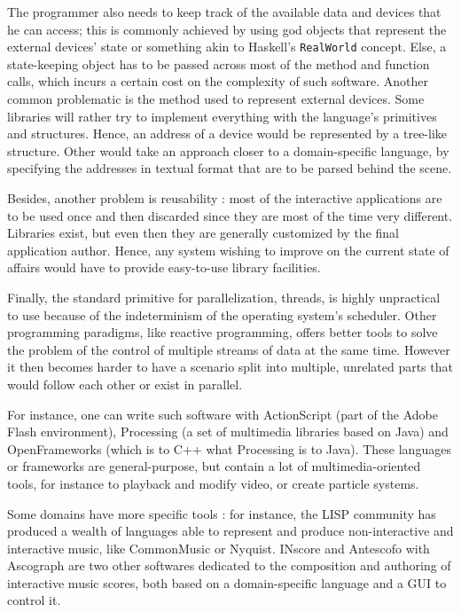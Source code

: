 \documentclass{sigchi}
\begin{document}
The programmer also needs to keep track of the available data and devices that he can access; this is commonly achieved by using god objects that represent the external devices' state or something akin to Haskell's \texttt{RealWorld} concept\cite{launchbury1995state}. Else, a state-keeping object has to be passed across most of the method and function calls, which incurs a certain cost on the complexity of such software. Another common problematic is the method used to represent external devices. Some libraries will rather try to implement everything with the language's primitives and structures. Hence, an address of a device would be represented by a tree-like structure. Other would take an approach closer to a domain-specific language, by specifying the addresses in textual format that are to be parsed behind the scene. 

Besides, another problem is reusability : most of the interactive applications are to be used once and then discarded since they are most of the time very different. Libraries exist, but even then they are generally customized by the final application author. Hence, any system wishing to improve on the current state of affairs would have to provide easy-to-use library facilities.

Finally, the standard primitive for parallelization, threads, is highly unpractical to use because of the indeterminism of the operating system's scheduler. Other programming paradigms, like reactive programming, offers better tools to solve the problem of the control of multiple streams of data at the same time. However it then becomes harder to have a scenario split into multiple, unrelated parts that would follow each other or exist in parallel.

For instance, one can write such software with ActionScript (part of the Adobe Flash environment), Processing (a set of multimedia libraries based on Java) and OpenFrameworks (which is to C++ what Processing is to Java)\cite{noble2009programming}. These languages or frameworks are general-purpose, but contain a lot of multimedia-oriented tools, for instance to playback and modify video, or create particle systems. 

Some domains have more specific tools : for instance, the LISP community has produced a wealth of languages able to represent and produce non-interactive and interactive music, like CommonMusic\cite{taube1997introduction} or Nyquist\cite{dannenbergnyquist}. INscore\cite{fober2013programming} and Antescofo with Ascograph\cite{coffy2014ascograph} are two other softwares dedicated to the composition and authoring of interactive music scores, both based on a domain-specific language and a GUI to control it.
\end{document}
